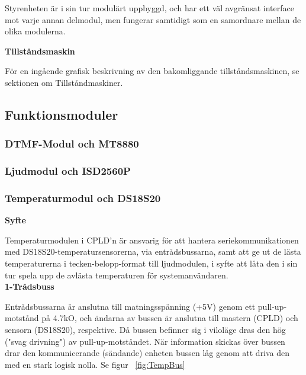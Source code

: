 \documentclass[a4paper,11pt]{article}
\begin{document}
Styrenheten är i sin tur modulärt uppbyggd, och har ett väl avgränsat interface mot varje annan delmodul, men
fungerar samtidigt som en samordnare mellan de olika modulerna.

{\noindent \bf Tillståndsmaskin}

För en ingående grafisk beskrivning av den bakomliggande tillståndsmaskinen, se sektionen om Tillståndmaskiner.

	\subsection{Funktionsmoduler}

		\subsubsection{DTMF-Modul och MT8880}
	
		\subsubsection{Ljudmodul och ISD2560P}

		\subsubsection{Temperaturmodul och DS18S20}

{\bf Syfte}

Temperaturmodulen i CPLD'n är ansvarig för att hantera seriekommunikationen med 
DS18S20-temperatursensorerna, via entrådsbussarna, samt att ge ut de lästa temperaturerna
i tecken-belopp-format till ljudmodulen, i syfte att låta den i sin tur spela upp de avlästa
temperaturen för systemanvändaren.\\

{\noindent \bf 1-Trådsbuss}

Entrådsbussarna är anslutna till matningsspänning (+5V) genom ett pull-up-motstånd på 4.7kO, och
ändarna av bussen är anslutna till mastern (CPLD) och sensorn (DS18S20), respektive. Då bussen
befinner sig i viloläge dras den hög ("svag drivning") av pull-up-motståndet. När information
skickas över bussen drar den kommunicerande (sändande) enheten bussen låg genom att driva den
med en stark logisk nolla. Se figur ~\ref{fig:TempBus}\\
\end{document}

